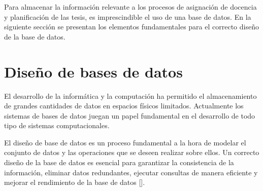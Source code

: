 








Para almacenar la información relevante a los procesos de 
asignación de docencia y planificación de las tesis, 
es imprescindible el uso de una base de datos. En la siguiente sección
se presentan los elementos fundamentales para el correcto diseño de la 
base de datos.


\section{Diseño de bases de datos}
El desarrollo de la informática y la computación ha permitido
el almacenamiento de grandes cantidades de datos en espacios 
físicos limitados. Actualmente los sistemas de bases de datos juegan
un papel fundamental en el desarrollo de todo tipo de sistemas computacionales.

El diseño de base de datos es un proceso fundamental a la hora 
de modelar el conjunto de datos y las operaciones que se deseen
realizar sobre ellos. Un correcto diseño de la base de datos
es esencial para garantizar la consistencia de la información,
eliminar datos redundantes, ejecutar consultas de manera 
eficiente y mejorar el rendimiento de la base de datos [\cite{db_book_cap2}]. 


